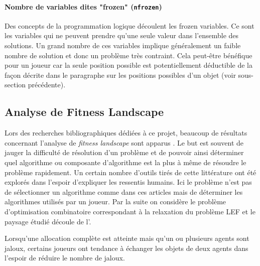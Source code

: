 \documentclass[../main.tex]{subfiles}
\begin{document}
	\paragraph{Nombre de variables dites "frozen" (\texttt{nfrozen})}{Des concepts de la programmation logique découlent les frozen variables. Ce sont les variables qui ne peuvent prendre qu'une seule valeur dans l'ensemble des solutions. Un grand nombre de ces variables implique généralement un faible nombre de solution et donc un problème très contraint. Cela peut-être bénéfique pour un joueur car la seule position possible est potentiellement déductible de la façon décrite dans le paragraphe sur les positions possibles d'un objet (voir sous-section précédente).}
	
	\subsection{Analyse de Fitness Landscape}
	Lors des recherches bibliographiques dédiées à ce projet, beaucoup de résultats concernant l'analyse de \textit{fitness landscape} sont apparus \cite{pitzer, garnier, stadler}. Le but est souvent de jauger la difficulté de résolution d'un problème et de pouvoir ainsi déterminer quel algorithme ou composante d'algorithme est la plus à même de résoudre le problème rapidement. Un certain nombre d'outils tirés de cette littérature ont été explorés dans l'espoir d'expliquer les ressentis humains. Ici le problème n'est pas de sélectionner un algorithme comme dans ces articles mais de déterminer les algorithmes utilisés par un joueur. Par la suite on considère le problème d'optimisation combinatoire correspondant à la relaxation du problème \textsc{LEF} et le paysage étudié découle de l'.
	
	\begin{observation}
	\label{obs-swap}
	Lorsqu'une allocation complète est atteinte mais qu'un ou plusieurs agents sont jaloux, certains joueurs ont tendance à échanger les objets de deux agents dans l'espoir de réduire le nombre de jaloux.
	\end{observation}
	
\end{document}
